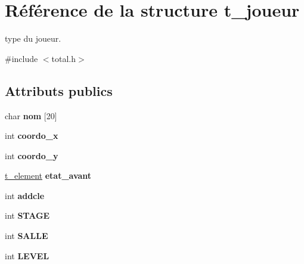\hypertarget{structt__joueur}{\section{Référence de la structure t\-\_\-joueur}
\label{structt__joueur}
}


type du joueur.  




{\ttfamily \#include $<$total.\-h$>$}

\subsection*{Attributs publics}
\begin{DoxyCompactItemize}
\item 
\hypertarget{structt__joueur_a064e13795b30484e6faa1738739bc7bc}{char {\bfseries nom} \mbox{[}20\mbox{]}}\label{structt__joueur_a064e13795b30484e6faa1738739bc7bc}

\item 
\hypertarget{structt__joueur_a987d204c2c8f75dc8c86c3c7cb068925}{int {\bfseries coordo\-\_\-x}}\label{structt__joueur_a987d204c2c8f75dc8c86c3c7cb068925}

\item 
\hypertarget{structt__joueur_a7323e5698a0c73ec7c832e04aecfd6aa}{int {\bfseries coordo\-\_\-y}}\label{structt__joueur_a7323e5698a0c73ec7c832e04aecfd6aa}

\item 
\hypertarget{structt__joueur_a1bca9feb84458e2d91467c2cfe2726ce}{\hyperlink{total_8h_a8b071baf43ce73c99f88fc8169b0514d}{t\-\_\-element} {\bfseries etat\-\_\-avant}}\label{structt__joueur_a1bca9feb84458e2d91467c2cfe2726ce}

\item 
\hypertarget{structt__joueur_a9968b8be2a2e33cf21326ea498e1f3c1}{int {\bfseries addcle}}\label{structt__joueur_a9968b8be2a2e33cf21326ea498e1f3c1}

\item 
\hypertarget{structt__joueur_a4f51a9801b83bc16f11b22b29014227c}{int {\bfseries S\-T\-A\-G\-E}}\label{structt__joueur_a4f51a9801b83bc16f11b22b29014227c}

\item 
\hypertarget{structt__joueur_af7c21acb1e1d31dcfa22965268391b7e}{int {\bfseries S\-A\-L\-L\-E}}\label{structt__joueur_af7c21acb1e1d31dcfa22965268391b7e}

\item 
\hypertarget{structt__joueur_a489ad8b9028b6ae20812e55db7e14596}{int {\bfseries L\-E\-V\-E\-L}}\label{structt__joueur_a489ad8b9028b6ae20812e55db7e14596}


\end{DoxyCompactItemize}
